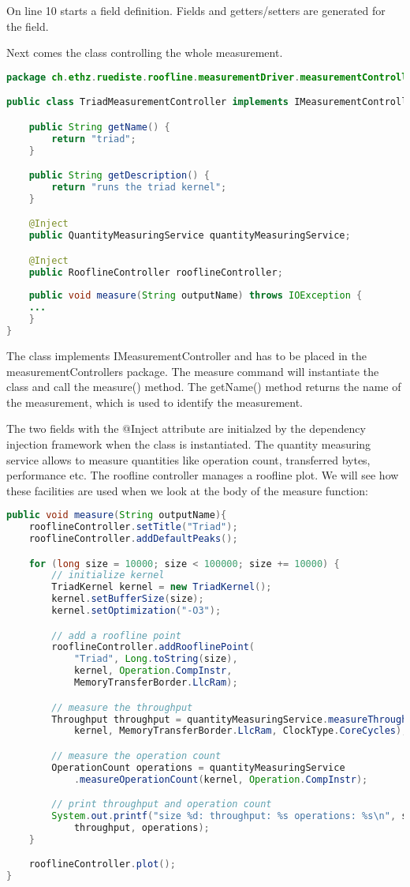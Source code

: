\documentclass[a4paper,12pt]{article}
\begin{document}
On line 10 starts a field definition. Fields and getters/setters are generated
for the field.

Next comes the class controlling the whole measurement. 
\begin{lstlisting}[language=JAVA]
package ch.ethz.ruediste.roofline.measurementDriver.measurementControllers;

public class TriadMeasurementController implements IMeasurementController {

	public String getName() {
		return "triad";
	}

	public String getDescription() {
		return "runs the triad kernel";
	}

	@Inject
	public QuantityMeasuringService quantityMeasuringService;

	@Inject
	public RooflineController rooflineController;
	
	public void measure(String outputName) throws IOException {
	...
	}
}
\end{lstlisting}
The class implements IMeasurementController and has to be placed in the
measurementControllers package. The measure command will instantiate the class
and call the measure() method. The getName() method returns the name of the
measurement, which is used to identify the measurement.

The two fields with the @Inject attribute are initialzed by the dependency
injection framework when the class is instantiated. The quantity measuring
service allows to measure quantities like operation count, transferred bytes,
performance etc. The roofline controller manages a roofline plot. We will see
how these facilities are used when we look at the body of the measure function:

\begin{lstlisting}[language=JAVA]
public void measure(String outputName){
	rooflineController.setTitle("Triad");
	rooflineController.addDefaultPeaks();

	for (long size = 10000; size < 100000; size += 10000) {
		// initialize kernel
		TriadKernel kernel = new TriadKernel();
		kernel.setBufferSize(size);
		kernel.setOptimization("-O3");

		// add a roofline point
		rooflineController.addRooflinePoint(
			"Triad", Long.toString(size),
			kernel, Operation.CompInstr,
			MemoryTransferBorder.LlcRam);

		// measure the throughput
		Throughput throughput = quantityMeasuringService.measureThroughput(
			kernel, MemoryTransferBorder.LlcRam, ClockType.CoreCycles);

		// measure the operation count
		OperationCount operations = quantityMeasuringService
			.measureOperationCount(kernel, Operation.CompInstr);

		// print throughput and operation count
		System.out.printf("size %d: throughput: %s operations: %s\n", size,
			throughput, operations);
	}

	rooflineController.plot();
}
\end{lstlisting}
\end{document}
